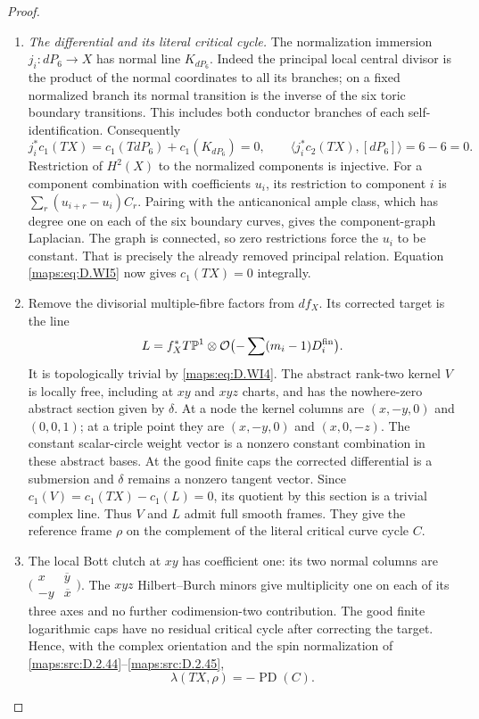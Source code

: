 \begin{proof}
\begin{enumerate}[label=\arabic*.,leftmargin=*]
\item \emph{The differential and its literal critical cycle.}
The normalization immersion $j_i:dP_6\longrightarrow X$ has
normal line $K_{dP_6}$.  Indeed the principal local central
divisor is the product of the normal coordinates to all its
branches; on a fixed normalized branch its normal transition
is the inverse of the six toric boundary transitions.  This
includes both conductor branches of each self-identification.
Consequently
\[
 j_i^*c_1(TX)=c_1(TdP_6)+c_1(K_{dP_6})=0,\qquad
 \langle j_i^*c_2(TX),[dP_6]\rangle=6-6=0 .
 \tag{D.WI5}\label{maps:eq:D.WI5}
\]
Restriction of $H^2(X)$ to the normalized components is injective.
For a component combination with coefficients $u_i$, its
restriction to component $i$ is
$\sum_r(u_{i+r}-u_i)C_r$.  Pairing with the anticanonical ample
class, which has degree one on each of the six boundary curves,
gives the component-graph Laplacian.  The graph is connected, so
zero restrictions force the $u_i$ to be constant.  That is
precisely the already removed principal relation.  Equation
\eqref{maps:eq:D.WI5} now gives $c_1(TX)=0$ integrally.

\item Remove the divisorial multiple-fibre factors from $df_X$.  Its
corrected target is the line
\[
 L=f_X^*T\mathbb P^1\otimes
                      \mathcal O\bigl(-\sum (m_i-1)D_i^{\rm fin}\bigr).
\]
It is topologically trivial by \eqref{maps:eq:D.WI4}.  The abstract rank-two
kernel $V$ is locally free, including at $xy$ and $xyz$ charts,
and has the nowhere-zero abstract section given by $\delta$.
At a node the kernel columns are $(x,-y,0)$ and $(0,0,1)$;
at a triple point they are $(x,-y,0)$ and $(x,0,-z)$.
The constant scalar-circle weight vector is a nonzero constant
combination in these abstract bases.  At the good finite caps
the corrected differential is a submersion and $\delta$ remains
a nonzero tangent vector.  Since
$c_1(V)=c_1(TX)-c_1(L)=0$, its quotient by this section is a
trivial complex line.  Thus $V$ and $L$ admit full smooth frames.
They give the reference frame $\rho$ on the complement of the
literal critical curve cycle $C$.

\item The local Bott clutch at $xy$ has coefficient one:
its two normal columns are
$\bigl(\begin{smallmatrix}x&\overline y\\-y&\overline x\end{smallmatrix}\bigr)$.
The $xyz$ Hilbert--Burch minors give multiplicity one on each
of its three axes and no further codimension-two contribution.
The good finite logarithmic caps have no residual critical
cycle after correcting the target.  Hence, with the complex
orientation and the spin normalization of \ref{maps:src:D.2.44}--\ref{maps:src:D.2.45},
\[
                 \lambda(TX,\rho)=-\operatorname{PD}(C).
 \tag{D.WI6}\label{maps:eq:D.WI6}
\]


\end{enumerate}
\end{proof}
